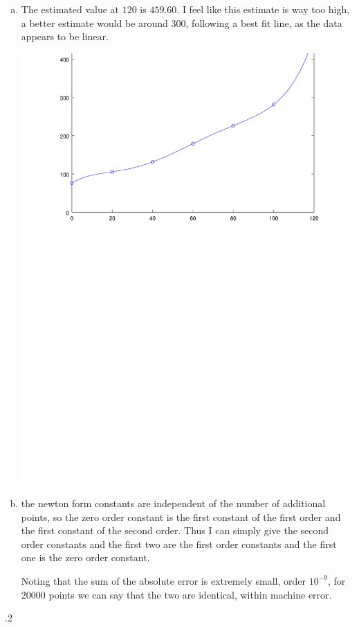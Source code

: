 \documentclass[12pt]{article}
\makeatletter
\theoremstyle{homework}
\newenvironment{exercise}[1]
{\def\@currentlabel{#1}\exercisecore}
{\endexercisecore}
\makeatother
\begin{document}
\begin{enumerate}[(a)]
\item
The estimated value at $120$ is $459.60$.  I feel like this estimate is way too high, a better estimate would be around $300$, following a best fit line, as the data appears to be linear.

\includegraphics[scale=.5]{../octave/p1.pdf}
\item
the newton form constants are independent of the number of additional points, so the zero order constant is the first constant of the first order and the first constant of the second order.  Thus I can simply give the second order constants and the first two are the first order constants and the first one is the zero order constant.


Noting that the sum of the absolute error is extremely small, order $10^{-9}$, for $20000$ points we can say that the two are identical, within machine error.
\end{enumerate}
\begin{exercise}

8.2
\end{exercise}
\end{document}
